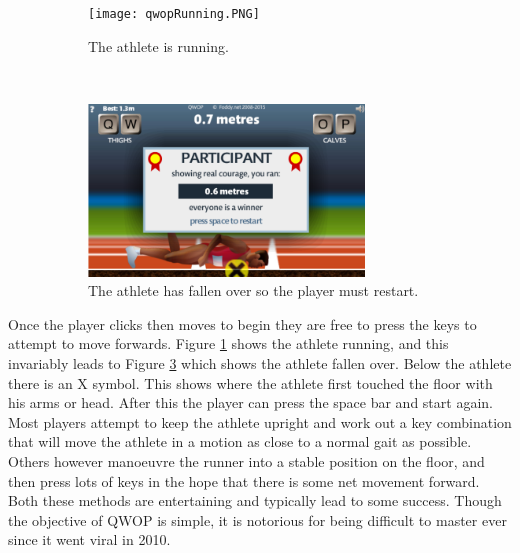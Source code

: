 \documentclass[12pt,a4paper,twoside,openright]{report}
\begin{document}
\begin{figure}[t!]
    \centering
    \begin{subfigure}[t]{0.45\textwidth}
        \centering
        \texttt{[image: qwopRunning.PNG]}
        \caption{The athlete is running.}
        \label{athleteRunning}
    \end{subfigure}
    ~
    \begin{subfigure}[t]{0.45\textwidth}
        \centering
        \includegraphics[height=1.8in]{qwopFallen.PNG}
        \caption{The athlete has fallen over so the player must restart.}
        \label{athleteFallen}
    \end{subfigure}
    \caption{}
\end{figure}

Once the player clicks then moves to begin they are free to press the keys to attempt to move forwards. Figure \ref{athleteRunning} shows the athlete running, and this invariably leads to Figure \ref{athleteFallen} which shows the athlete fallen over.
Below the athlete there is an X symbol. This shows where the athlete first touched the floor with his arms or head.
After this the player can press the space bar and start again.
Most players attempt to keep the athlete upright and work out a key combination that will move the athlete in a motion as close to a normal gait as possible.
Others however manoeuvre the runner into a stable position on the floor, and then press lots of keys in the hope that there is some net movement forward.
Both these methods are entertaining and typically lead to some success.
Though the objective of QWOP is simple, it is notorious for being difficult to master ever since it went viral in 2010.
\end{document}
